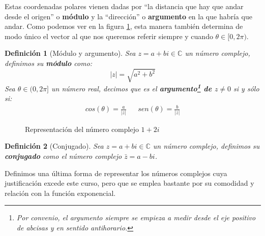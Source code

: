 \documentclass[10pt,a4paper,openright]{book}
\theoremstyle{break}
\newtheorem{defi}{Definición}[chapter]
\begin{document}
Estas coordenadas polares vienen dadas por ``la distancia que hay que andar desde el origen'' o \textbf{módulo} y la ``dirección'' o \textbf{argumento} en la que habría que andar. Como podemos ver en la figura \ref{fig: polares}, esta manera también determina de modo único el vector al que nos queremos referir siempre y cuando $\theta \in [0, 2\pi)$.

\begin{defi}[Módulo y argumento]
Sea $z=a+bi\in \mathbb C$ un número complejo, definimos su \textbf{módulo} como:
\[
|z|=\sqrt{a^2+b^2}
\]
Sea $\theta\in (0,2\pi]$ un número real, decimos que es el \textbf{argumento\footnote{Por convenio, el argumento siempre se empieza a medir desde el eje positivo de abcisas y en sentido antihorario.} de $z\neq 0$} si y sólo si:
\begin{align*}
cos(\theta)=\frac{a}{|z|} & & sen(\theta)=\frac{b}{|z|}
\end{align*}
\end{defi}

\begin{figure}[h]
	\centering
	\caption{Representación del número complejo $1 + 2i$}
	\label{fig: polares}
	\end{figure}

\begin{defi}[Conjugado]
Sea $z=a+bi\in \mathbb C$ un número complejo, definimos su \textbf{conjugado} como el número complejo $\bar{z}=a-bi$.
\end{defi}

Definimos una última forma de representar los números complejos cuya justificación excede este curso, pero que se emplea bastante por su comodidad y relación con la función exponencial.
\end{document}
